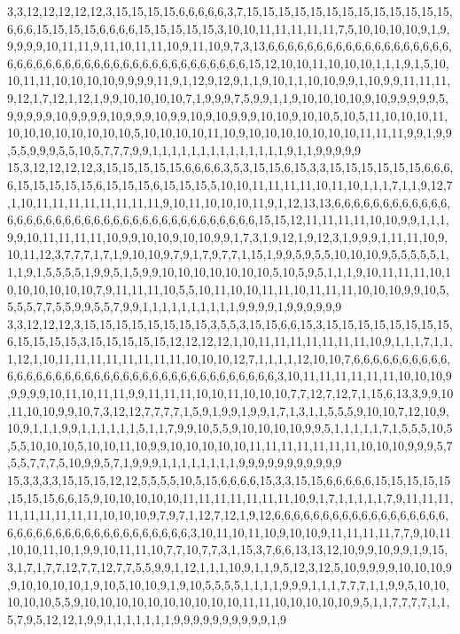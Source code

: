 3,3,12,12,12,12,12,3,15,15,15,15,6,6,6,6,6,3,7,15,15,15,15,15,15,15,15,15,15,15,15,15,6,6,6,15,15,15,15,6,6,6,6,15,15,15,15,15,3,10,10,11,11,11,11,11,7,5,10,10,10,10,9,1,9,9,9,9,9,10,11,11,9,11,10,11,11,10,9,11,10,9,7,3,13,6,6,6,6,6,6,6,6,6,6,6,6,6,6,6,6,6,6,6,6,6,6,6,6,6,6,6,6,6,6,6,6,6,6,6,6,6,6,6,6,6,6,6,6,15,12,10,10,11,10,10,10,1,1,1,9,1,5,10,10,11,11,10,10,10,10,9,9,9,9,11,9,1,12,9,12,9,1,1,9,10,1,1,10,10,9,9,1,10,9,9,11,11,11,9,12,1,7,12,1,12,1,9,9,10,10,10,10,7,1,9,9,9,7,5,9,9,1,1,9,10,10,10,10,9,10,9,9,9,9,9,5,9,9,9,9,9,10,9,9,9,9,10,9,9,9,10,9,9,10,9,10,9,9,9,10,10,9,10,10,5,10,5,11,10,10,10,11,10,10,10,10,10,10,10,10,5,10,10,10,10,11,10,9,10,10,10,10,10,10,10,11,11,11,9,9,1,9,9,5,5,9,9,9,5,5,10,5,7,7,7,9,9,1,1,1,1,1,1,1,1,1,1,1,1,1,1,9,1,1,9,9,9,9,9
15,3,12,12,12,12,3,15,15,15,15,15,6,6,6,6,3,5,3,15,15,6,15,3,3,15,15,15,15,15,15,6,6,6,6,15,15,15,15,15,6,15,15,15,6,15,15,15,5,10,10,11,11,11,11,10,11,10,1,1,1,7,1,1,9,12,7,1,10,11,11,11,11,11,11,11,11,9,10,11,10,10,10,11,9,1,12,13,13,6,6,6,6,6,6,6,6,6,6,6,6,6,6,6,6,6,6,6,6,6,6,6,6,6,6,6,6,6,6,6,6,6,6,6,6,6,6,15,15,12,11,11,11,11,10,10,9,9,1,1,1,9,9,10,11,11,11,11,10,9,9,10,10,9,10,10,9,9,1,7,3,1,9,12,1,9,12,3,1,9,9,9,1,11,11,10,9,10,11,12,3,7,7,7,1,7,1,9,10,10,9,7,9,1,7,9,7,7,1,15,1,9,9,5,9,5,5,10,10,10,9,5,5,5,5,5,1,1,1,9,1,5,5,5,5,1,9,9,5,1,5,9,9,10,10,10,10,10,10,10,5,10,5,9,5,1,1,1,9,10,11,11,11,10,10,10,10,10,10,10,7,9,11,11,11,10,5,5,10,11,10,10,11,11,10,11,11,11,10,10,10,9,9,10,5,5,5,5,7,7,5,5,9,9,5,5,7,9,9,1,1,1,1,1,1,1,1,1,1,9,9,9,9,1,9,9,9,9,9,9
3,3,12,12,12,3,15,15,15,15,15,15,15,15,3,5,5,3,15,15,6,6,15,3,15,15,15,15,15,15,15,15,6,15,15,15,15,3,15,15,15,15,15,12,12,12,12,1,10,11,11,11,11,11,11,11,10,9,1,1,1,7,1,1,1,12,1,10,11,11,11,11,11,11,11,11,10,10,10,12,7,1,1,1,1,12,10,10,7,6,6,6,6,6,6,6,6,6,6,6,6,6,6,6,6,6,6,6,6,6,6,6,6,6,6,6,6,6,6,6,6,6,6,6,6,6,6,3,10,11,11,11,11,11,11,10,10,10,9,9,9,9,9,10,11,10,11,11,9,9,11,11,11,10,10,11,10,10,10,7,7,12,7,12,7,1,15,6,13,3,9,9,10,11,10,10,9,9,10,7,3,12,12,7,7,7,7,1,5,9,1,9,9,1,9,9,1,7,1,3,1,1,5,5,5,9,10,10,7,12,10,9,10,9,1,1,1,9,9,1,1,1,1,1,1,5,1,1,7,9,9,10,5,5,9,10,10,10,10,9,9,5,1,1,1,1,1,7,1,5,5,5,10,5,5,5,10,10,10,5,10,10,11,10,9,9,10,10,10,10,10,11,11,11,11,11,11,11,10,10,10,9,9,9,5,7,5,5,7,7,7,5,10,9,9,5,7,1,9,9,9,1,1,1,1,1,1,1,1,9,9,9,9,9,9,9,9,9,9,9
15,3,3,3,3,15,15,15,12,12,5,5,5,5,10,5,15,6,6,6,6,15,3,3,15,15,6,6,6,6,6,15,15,15,15,15,15,15,15,6,6,15,9,10,10,10,10,10,11,11,11,11,11,11,11,10,9,1,7,1,1,1,1,1,7,9,11,11,11,11,11,11,11,11,11,10,10,10,9,7,9,7,1,12,7,12,1,9,12,6,6,6,6,6,6,6,6,6,6,6,6,6,6,6,6,6,6,6,6,6,6,6,6,6,6,6,6,6,6,6,6,6,6,6,6,6,3,10,11,10,11,10,9,10,10,9,11,11,11,11,7,7,9,10,11,10,10,11,10,1,9,9,10,11,11,10,7,7,10,7,7,3,1,15,3,7,6,6,13,13,12,10,9,9,10,9,9,1,9,15,3,1,7,1,7,7,12,7,7,12,7,7,5,5,9,9,1,12,1,1,1,10,9,1,1,9,5,12,3,12,5,10,9,9,9,9,10,10,10,9,9,10,10,10,10,1,9,10,5,10,10,9,1,9,10,5,5,5,5,1,1,1,1,9,9,9,1,1,1,7,7,7,1,1,9,9,5,10,10,10,10,10,5,5,9,10,10,10,10,10,10,10,10,10,10,11,11,10,10,10,10,10,9,5,1,1,7,7,7,7,1,1,5,7,9,5,12,12,1,9,9,1,1,1,1,1,1,1,9,9,9,9,9,9,9,9,9,9,1,9
